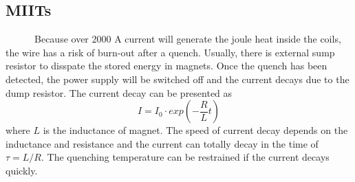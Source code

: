   \subsection{MIITs}
~~~~~~Because over 2000 A current will generate the joule heat inside the coils, the wire has a risk of burn-out after a quench.
Usually, there is external sump resistor to disspate the stored energy in magnets.
Once the quench has been detected, the power supply will be switched off and the current decays due to the dump resistor.
The current decay can be presented as
\begin{equation}
 I = I_0 \cdot exp(-\frac{R}{L} t)
\end{equation}
where $L$ is the inductance of magnet.
The speed of current decay depends on the inductance and resistance and the current can totally decay in the time of $\tau = L/R$.
The quenching temperature can be restrained if the current decays quickly.

